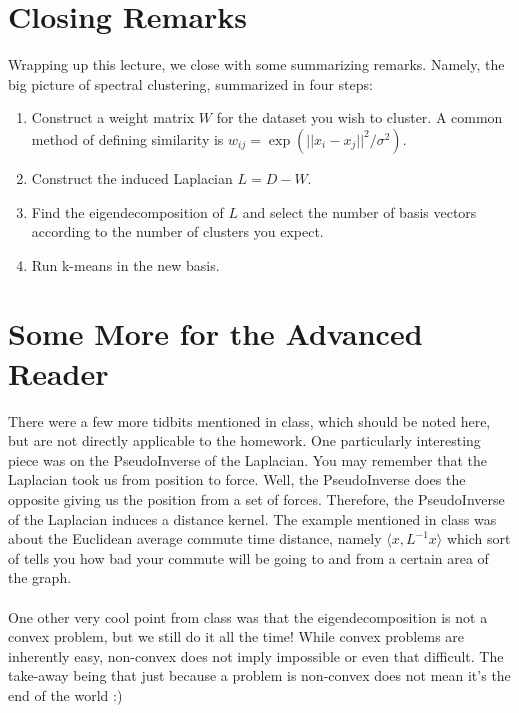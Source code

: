 \section{Closing Remarks}
Wrapping up this lecture, we close with some summarizing
remarks. Namely, the big picture of spectral clustering, summarized in
four steps: 
\begin{enumerate} 
\item Construct a weight matrix \(W\) for the dataset you wish to
  cluster. A common method of defining similarity is \(w_{ij} =
  \exp({||x_i - x_j||^2 / \sigma^2})\). 
\item Construct the induced Laplacian \(L = D-W\).
\item Find the eigendecomposition of \(L\) and select the number of
  basis vectors according to the number of clusters you expect. 
\item Run k-means in the new basis.
\end{enumerate}

\section{Some More for the Advanced Reader}
There were a few more tidbits mentioned in class, which should be
noted here, but are not directly applicable to the homework. One
particularly interesting piece was on the PseudoInverse of the
Laplacian. You may remember that the Laplacian took us from position
to force. Well, the PseudoInverse does the opposite giving us the
position from a set of forces. Therefore, the PseudoInverse of the
Laplacian induces a distance kernel. The example mentioned in class
was about the Euclidean average commute time distance, namely
\(\langle x, L^{-1}x \rangle\) which sort of tells you how bad your
commute will be going to and from a certain area of the graph.  
\\\\
One other very cool point from class was that the eigendecomposition
is not a convex problem, but we still do it all the time! While convex
problems are inherently easy, non-convex does not imply impossible or
even that difficult. The take-away being that just because a problem
is non-convex does not mean it's the end of the world :) 

